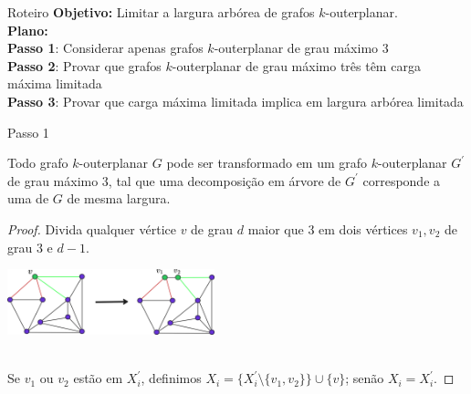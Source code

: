 \begin{frame}{Roteiro}
    \textbf{Objetivo:} Limitar a largura arbórea de grafos $k$-outerplanar.\\
    \pause\bigbreak
    \textbf{Plano:}\\
    \vspace{0.2cm}
    \hspace{0.4cm}\textbf{Passo 1}: Considerar apenas grafos $k$-outerplanar de grau máximo $3$\\
    \pause
    \vspace{0.1cm}
    \hspace{0.4cm}\textbf{Passo 2}: Provar que grafos $k$-outerplanar de grau máximo três têm carga máxima limitada\\
    \pause
    \vspace{0.1cm}
    \hspace{0.4cm}\textbf{Passo 3}: Provar que carga máxima limitada implica em largura arbórea limitada
\end{frame}

\begin{frame}{Passo 1}
    \begin{lema}
        Todo grafo $k$-outerplanar $G$ pode ser transformado em um grafo $k$-outerplanar $G^{\prime}$ de grau máximo 3, tal que uma decomposição em árvore de $G^{\prime}$ corresponde a uma de $G$ de mesma largura.
    \end{lema}
    \begin{proof}
        Divida qualquer vértice $v$ de grau $d$ maior que $3$ em dois vértices $v_1, v_2$ de grau $3$ e $d-1$.\\
        \vspace{0.2cm}
        \begin{minipage}{\linewidth}
            \centering
            \includegraphics[width=6cm]{images/proof_1_1.png}
        \end{minipage}\\
        \vspace{0.4cm}
        Se $v_{1}$ ou $v_{2}$ estão em $X^{\prime}_{i}$, definimos $X_{i}=\{X^{\prime}_{i}\setminus\{v_{1}, v_{2}\}\} \cup \{v\}$; senão $X_{i}=X^{\prime}_{i}$. \phantom{\qedhere}
    \end{proof}
\end{frame}


